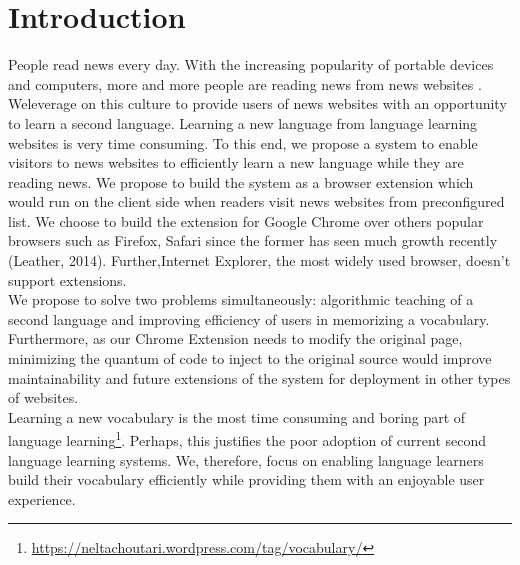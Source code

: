 \section{Introduction}
People read news every day. With the increasing popularity of 
portable devices and computers, more and more people are reading 
news from news websites \cite{yarlh2012}.
\\
Weleverage on this culture to provide users of news websites 
with an opportunity to learn a second language.
Learning a new language from language learning websites is very time consuming. 
To this end, we propose a system to enable visitors to news websites to 
efficiently learn a new language while they are reading news. We propose to 
build the system as a browser extension which would run on the client side 
when readers visit news websites from preconfigured list.
We choose to build the extension for Google Chrome over others popular browsers 
such as Firefox, Safari since the former has seen much growth recently (Leather, 2014). 
Further,Internet Explorer, the most widely used browser, doesn't support extensions.
\\
We propose to solve two problems simultaneously: algorithmic  
teaching of a second language and improving efficiency of users in 
memorizing a vocabulary.
Furthermore, as our Chrome Extension needs to modify the original page, 
minimizing the quantum of code to inject to the original source would 
improve maintainability and future extensions of the system 
for deployment in other types of websites.
\\
Learning a new vocabulary is the most time consuming and boring part of 
language learning\footnote{\url{https://neltachoutari.wordpress.com/tag/vocabulary/}}. Perhaps, this justifies the 
poor adoption of current second language learning systems. We, therefore, 
focus on enabling language learners build their vocabulary efficiently while 
providing them with an enjoyable user experience.